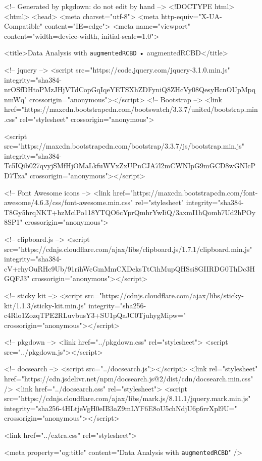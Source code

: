 <!-- Generated by pkgdown: do not edit by hand -->
<!DOCTYPE html>
<html>
  <head>
  <meta charset="utf-8">
<meta http-equiv="X-UA-Compatible" content="IE=edge">
<meta name="viewport" content="width=device-width, initial-scale=1.0">

<title>Data Analysis with \texttt{augmentedRCBD} • augmentedRCBD</title>

<!-- jquery -->
<script src="https://code.jquery.com/jquery-3.1.0.min.js" integrity="sha384-nrOSfDHtoPMzJHjVTdCopGqIqeYETSXhZDFyniQ8ZHcVy08QesyHcnOUpMpqnmWq" crossorigin="anonymous"></script>
<!-- Bootstrap -->
<link href="https://maxcdn.bootstrapcdn.com/bootswatch/3.3.7/united/bootstrap.min.css" rel="stylesheet" crossorigin="anonymous">

<script src="https://maxcdn.bootstrapcdn.com/bootstrap/3.3.7/js/bootstrap.min.js" integrity="sha384-Tc5IQib027qvyjSMfHjOMaLkfuWVxZxUPnCJA7l2mCWNIpG9mGCD8wGNIcPD7Txa" crossorigin="anonymous"></script>

<!-- Font Awesome icons -->
<link href="https://maxcdn.bootstrapcdn.com/font-awesome/4.6.3/css/font-awesome.min.css" rel="stylesheet" integrity="sha384-T8Gy5hrqNKT+hzMclPo118YTQO6cYprQmhrYwIiQ/3axmI1hQomh7Ud2hPOy8SP1" crossorigin="anonymous">

<!-- clipboard.js -->
<script src="https://cdnjs.cloudflare.com/ajax/libs/clipboard.js/1.7.1/clipboard.min.js" integrity="sha384-cV+rhyOuRHc9Ub/91rihWcGmMmCXDeksTtCihMupQHSsi8GIIRDG0ThDc3HGQFJ3" crossorigin="anonymous"></script>

<!-- sticky kit -->
<script src="https://cdnjs.cloudflare.com/ajax/libs/sticky-kit/1.1.3/sticky-kit.min.js" integrity="sha256-c4Rlo1ZozqTPE2RLuvbusY3+SU1pQaJC0TjuhygMipw=" crossorigin="anonymous"></script>

<!-- pkgdown -->
<link href="../pkgdown.css" rel="stylesheet">
<script src="../pkgdown.js"></script>


<!-- docsearch -->
<script src="../docsearch.js"></script>
<link rel="stylesheet" href="https://cdn.jsdelivr.net/npm/docsearch.js@2/dist/cdn/docsearch.min.css" />
<link href="../docsearch.css" rel="stylesheet">
<script src="https://cdnjs.cloudflare.com/ajax/libs/mark.js/8.11.1/jquery.mark.min.js" integrity="sha256-4HLtjeVgH0eIB3aZ9mLYF6E8oU5chNdjU6p6rrXpl9U=" crossorigin="anonymous"></script>


  <link href="../extra.css" rel="stylesheet">
  
<meta property="og:title" content="Data Analysis with \texttt{augmentedRCBD}" />

